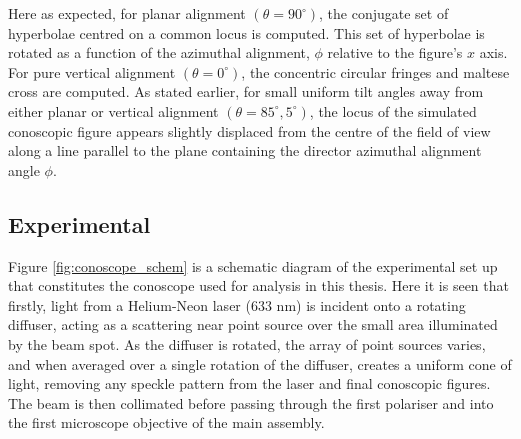 Here as expected, for planar alignment $\left(\theta=90^{\circ}\right)$, the conjugate set of hyperbolae centred on a common locus is computed. This set of hyperbolae is rotated as a function of the azimuthal alignment, $\phi$ relative to the figure's $x$ axis. For pure vertical alignment $\left(\theta=0^{\circ}\right)$, the concentric circular fringes and maltese cross are computed. As stated earlier, for small uniform tilt angles away from either planar or vertical alignment $\left(\theta=85^{\circ},5^{\circ}\right)$, the locus of the simulated conoscopic figure appears slightly displaced from the centre of the field of view along a line parallel to the plane containing the director azimuthal alignment angle $\phi$.

\subsection{Experimental}
Figure \ref{fig:conoscope_schem} is a schematic diagram of the experimental set up that constitutes the conoscope used for analysis in this thesis. Here it is seen that firstly, light from a Helium-Neon laser (633 nm) is incident onto a rotating diffuser, acting as a scattering near point source over the small area illuminated by the beam spot. As the diffuser is rotated, the array of point sources varies, and when averaged over a single rotation of the diffuser, creates a uniform cone of light, removing any speckle pattern from the laser and final conoscopic figures. The beam is then collimated before passing through the first polariser and into the first microscope objective of the main assembly.


